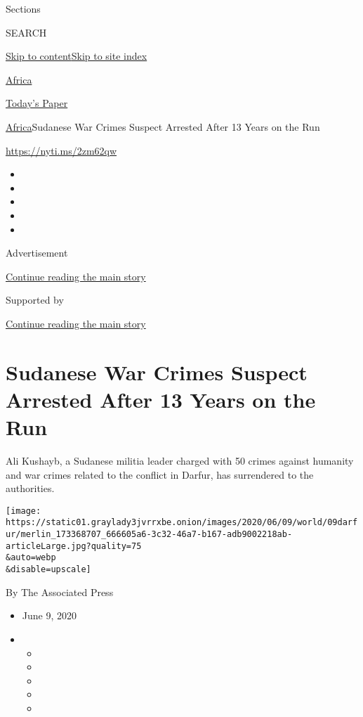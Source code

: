 Sections

SEARCH

\protect\hyperlink{site-content}{Skip to
content}\protect\hyperlink{site-index}{Skip to site index}

\href{https://www.nytimes3xbfgragh.onion/section/world/africa}{Africa}

\href{https://myaccount.nytimes3xbfgragh.onion/auth/login?response_type=cookie\&client_id=vi}{}

\href{https://www.nytimes3xbfgragh.onion/section/todayspaper}{Today's
Paper}

\href{/section/world/africa}{Africa}\textbar{}Sudanese War Crimes
Suspect Arrested After 13 Years on the Run

\url{https://nyti.ms/2zm62qw}

\begin{itemize}
\item
\item
\item
\item
\item
\end{itemize}

Advertisement

\protect\hyperlink{after-top}{Continue reading the main story}

Supported by

\protect\hyperlink{after-sponsor}{Continue reading the main story}

\hypertarget{sudanese-war-crimes-suspect-arrested-after-13-years-on-the-run}{%
\section{Sudanese War Crimes Suspect Arrested After 13 Years on the
Run}\label{sudanese-war-crimes-suspect-arrested-after-13-years-on-the-run}}

Ali Kushayb, a Sudanese militia leader charged with 50 crimes against
humanity and war crimes related to the conflict in Darfur, has
surrendered to the authorities.

\texttt{[image: https://static01.graylady3jvrrxbe.onion/images/2020/06/09/world/09darfur/merlin\_173368707\_666605a6-3c32-46a7-b167-adb9002218ab-articleLarge.jpg?quality=75\\\&auto=webp\\\&disable=upscale]}

By The Associated Press

\begin{itemize}
\item
  June 9, 2020
\item
  \begin{itemize}
  \item
  \item
  \item
  \item
  \item
  \end{itemize}
\end{itemize}

